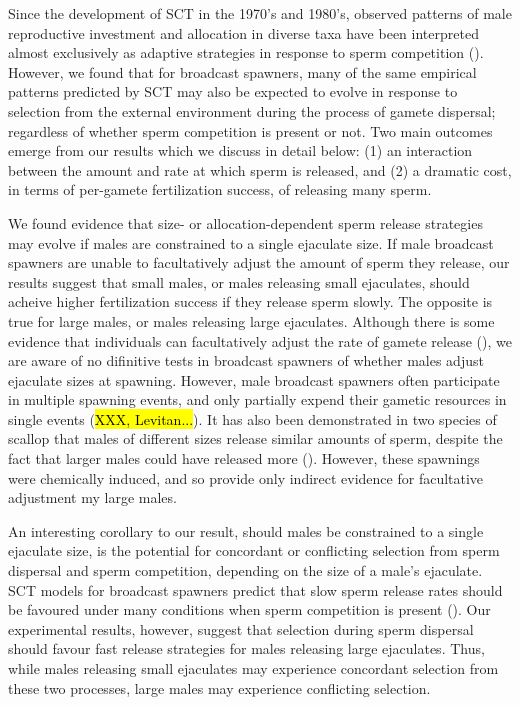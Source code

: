 \documentclass{article}
\begin{document}
Since the development of SCT in the 1970's and 1980's, observed patterns of male reproductive investment and allocation in diverse taxa have been interpreted almost exclusively as adaptive strategies in response to sperm competition (\citealt{Parker1972,Parker1982,Wedell2002}). However, we found that for broadcast spawners, many of the same empirical patterns predicted by SCT may also be expected to evolve in response to selection from the external environment during the process of gamete dispersal; regardless of whether sperm competition is present or not. Two main outcomes emerge from our results which we discuss in detail below: (1) an interaction between the amount and rate at which sperm is released, and (2) a dramatic cost, in terms of per-gamete fertilization success, of releasing many sperm.

We found evidence that size- or allocation-dependent sperm release strategies may evolve if males are constrained to a single ejaculate size. If male broadcast spawners are unable to facultatively adjust the amount of sperm they release, our results suggest that small males, or males releasing small ejaculates, should acheive higher fertilization success if they release sperm slowly. The opposite is true for large males, or males releasing large ejaculates. Although there is some evidence that individuals can facultatively adjust the rate of gamete release (\citealt{Marshall2004}), we are aware of no difinitive tests in broadcast spawners of whether males adjust ejaculate sizes at spawning. However, male broadcast spawners often participate in multiple spawning events, and only partially expend their gametic resources in single events (\hl{XXX, Levitan...}). It has also been demonstrated in two species of scallop that males of different sizes release similar amounts of sperm, despite the fact that larger males could have released more (\citealt{Styan2003}). However, these spawnings were chemically induced, and so provide only indirect evidence for facultative adjustment my large males. 

An interesting corollary to our result, should males be constrained to a single ejaculate size, is the potential for concordant or conflicting selection from sperm dispersal and sperm competition, depending on the size of a male's ejaculate. SCT models for broadcast spawners predict that slow sperm release rates should be favoured under many conditions when sperm competition is present (\citealt{Olito2015,Olito2017}). Our experimental results, however, suggest that selection during sperm dispersal should favour fast release strategies for males releasing large ejaculates. Thus, while males releasing small ejaculates may experience concordant selection from these two processes, large males may experience conflicting selection.
\end{document}
